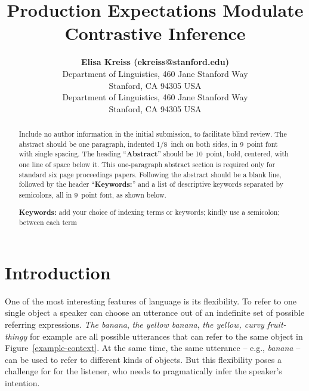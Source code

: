 \documentclass[10pt,letterpaper]{article}
\title{Production Expectations Modulate Contrastive Inference}
\author{{\large \bf Elisa Kreiss (ekreiss@stanford.edu)} \\
  Department of Linguistics, 460 Jane Stanford Way \\
  Stanford, CA 94305 USA
  \AND {\large \bf Judith Degen (jdegen@stanford.edu)} \\
  Department of Linguistics, 460 Jane Stanford Way \\
  Stanford, CA 94305 USA}
\newcommand{\jd}[1]{\textcolor{Purple}{[jd: #1]}}
\begin{document}
\maketitle

\begin{abstract}
Include no author information in the initial submission, to facilitate
blind review.  The abstract should be one paragraph, indented 1/8~inch on both sides,
in 9~point font with single spacing. The heading ``{\bf Abstract}''
should be 10~point, bold, centered, with one line of space below
it. This one-paragraph abstract section is required only for standard
six page proceedings papers. Following the abstract should be a blank
line, followed by the header ``{\bf Keywords:}'' and a list of
descriptive keywords separated by semicolons, all in 9~point font, as
shown below.

\textbf{Keywords:} 
add your choice of indexing terms or keywords; kindly use a
semicolon; between each term
\end{abstract}

\section{Introduction}

One of the most interesting features of language is its flexibility. To refer to one single object a speaker can choose an utterance out of an indefinite set of possible referring expressions. \textit{The banana}, \textit{the yellow banana}, \textit{the yellow, curvy fruit-thingy} for example are all possible utterances that can refer to the same object in Figure~\ref{example-context}. At the same time, the same utterance -- e.g., \emph{banana} -- can be used to refer to different kinds of objects. But this flexibility poses a challenge for for the listener, who needs to pragmatically infer the speaker's intention.
\end{document}
